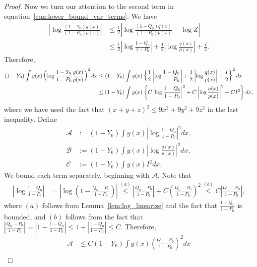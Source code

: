 \documentclass{article}
\begin{document}
\begin{proof}
Now we turn our attention to the second term in equation~\eqref{eqn:lower_bound_var_terms}. We have
\begin{align*}
\left| \log \frac{(1-Y_0) y(x)}{(1-P_0)p(x)} \right| &\leq 
              \frac{1}{2} \left| \log \frac{ (1-Q_0) q(x)}{(1-P_0)p(x)} - \log Z \right| \\
%
    &\leq \frac{1}{2} \left| \log \frac{1 - Q_0}{1-P_0} \right| + 
               \frac{1}{2} \left| \log \frac{q(x)}{p(x)} \right| + \frac{I}{2}.
\end{align*}
Therefore,
\begin{align}
\label{EqnNoodle}
(1 - Y_0) \int y(x) \left( \log \frac{1 - Y_0}{1 - P_0} \frac{y(x)}{p(x)} \right)^2 dx &\leq 
   (1 - Y_0) \int y(x) \left\{ \frac{1}{2} \left| \log \frac{1-Q_0}{1-P_0} \right| 
              +  \frac{1}{2} \left| \log \frac{q(x)}{p(x)}\right| + \frac{I}{2}\right\}^2 dx \notag \\
  &\leq (1 - Y_0) \int y(x) \left\{ C \left| \log \frac{1-Q_0}{1-P_0} \right|^2 + 
                   C \left| \log \frac{q(x)}{p(x)}\right|^2 + C I^2 \right\} dx,
\end{align}
where we have used the fact that $(x + y + z)^2 \leq 9x^2 + 9y^2 + 9z^2$ in the last inequality.
Define
\begin{align*}
\mathcal{A} & := (1 - Y_0) \int y(x) \left| \log \frac{1-Q_0}{1-P_0} \right|^2 dx, \\
% 
\mathcal{B} & := (1 - Y_0) \int y(x) \left| \log \frac{q(x)}{p(x)}\right|^2 dx, \\
%
\mathcal{C} & := (1 - Y_0) \int y(x) I^2  dx.
\end{align*}
We bound each term separately, beginning with $\mathcal{A}$. Note that
\begin{align*}
\left| \log \frac{1 - Q_0}{1- P_0} \right| &= \left| \log \left( 1 - \frac{Q_0 - P_0}{1 - P_0} \right) \right| \stackrel{(a)} \leq \left| \frac{Q_0 - P_0}{1 - P_0} \right| + C \left( \frac{Q_0 - P_0}{1 - P_0} \right)^2 \stackrel{(b)} \leq C \left| \frac{Q_0 - P_0}{1 - P_0} \right|,
\end{align*}
where $(a)$ follows from Lemma~\ref{lem:log_linearize} and the fact that $\frac{1 - Q_0}{1 - P_0}$ is bounded, and $(b)$ follows from the fact that $\left| \frac{Q_0 - P_0}{1 - P_0} \right| = \left| 1 - \frac{1 - Q_0}{1 - P_0} \right| \leq 1 + \left| \frac{1 - Q_0}{1 - P_0} \right| \leq C$. Therefore,
\begin{align*} 
\mathcal{A} & \le C(1 - Y_0) \int y(x) \left( \frac{Q_0 - P_0}{1 - P_0} \right)^2 dx \\

\end{align*}
\end{proof}
\end{document}
